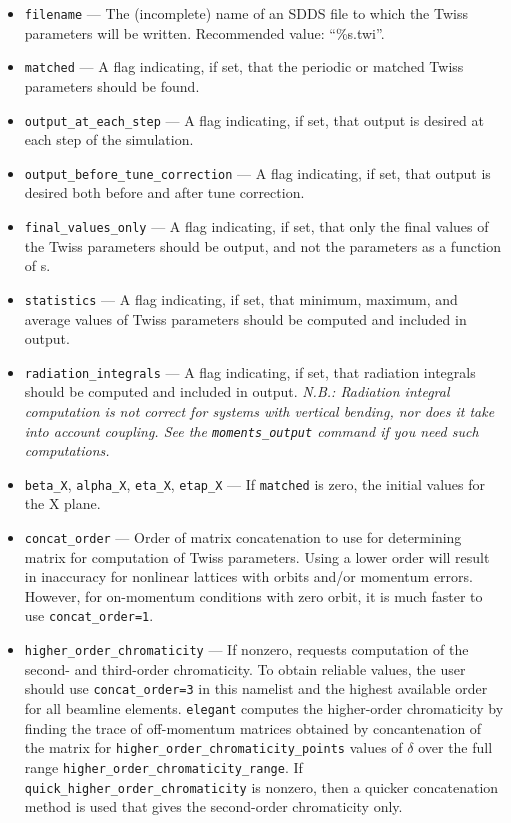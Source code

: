 \documentclass[11pt]{article}
\begin{document}
\begin{itemize}
\item \verb|filename| --- The (incomplete) name of an SDDS file to which the Twiss parameters will be written.
 Recommended value: ``\%s.twi''.
\item \verb|matched| --- A flag indicating, if set, that the periodic or matched Twiss parameters should be found.
\item \verb|output_at_each_step| --- A flag indicating, if set, that output is desired at each step of the simulation.
\item \verb|output_before_tune_correction| --- A flag indicating, if set, that output is desired both before and after
tune correction.
\item \verb|final_values_only| --- A flag indicating, if set, that only the final values of the Twiss parameters should
be output, and not the parameters as a function of s.
\item \verb|statistics| --- A flag indicating, if set, that minimum, maximum, and average values of
Twiss parameters should be computed and included in output.
\item \verb|radiation_integrals| --- A flag indicating, if set, that radiation integrals should be computed
and included in output. {\em N.B.: Radiation integral computation is not correct for systems with vertical
bending, nor does it take into account coupling.  See the \verb|moments_output| command if you need such
computations.}
\item \verb|beta_X|, \verb|alpha_X|, \verb|eta_X|, \verb|etap_X| --- If \verb|matched| is zero, the initial values for
the X plane.

\item \verb|concat_order| --- Order of matrix concatenation to use for
determining matrix for computation of Twiss parameters.  Using a lower
order will result in inaccuracy for nonlinear lattices with orbits
and/or momentum errors.  However, for on-momentum conditions with zero
orbit, it is much faster to use \verb|concat_order=1|.

\item \verb|higher_order_chromaticity| --- If nonzero, requests
computation of the second- and third-order chromaticity.  To obtain
reliable values, the user should use \verb|concat_order=3| in this
namelist and the highest available order for all beamline elements.
{\tt elegant} computes the higher-order chromaticity by finding the
trace of off-momentum matrices obtained by concantenation of the
matrix for \verb|higher_order_chromaticity_points| values of $\delta$
over the full range \verb|higher_order_chromaticity_range|.
If \verb|quick_higher_order_chromaticity| is nonzero, then a quicker concatenation method is
used that gives the second-order chromaticity only.


\end{itemize}
\end{document}
